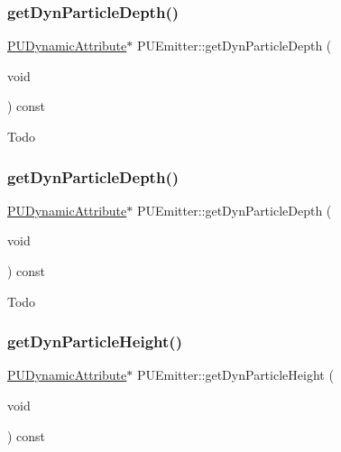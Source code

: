 \subsubsection{\texorpdfstring{get\+Dyn\+Particle\+Depth()}{getDynParticleDepth()}\hspace{0.1cm}{\footnotesize\ttfamily [1/2]}}
{\footnotesize\ttfamily \hyperlink{classPUDynamicAttribute}{P\+U\+Dynamic\+Attribute}$\ast$ P\+U\+Emitter\+::get\+Dyn\+Particle\+Depth (\begin{DoxyParamCaption}\item[{void}]{ }\end{DoxyParamCaption}) const\hspace{0.3cm}{\ttfamily [inline]}}

Todo \mbox{\label{classPUEmitter_a85a4428e2d1eb332d9f7eab2a411e56f}} 
\subsubsection{\texorpdfstring{get\+Dyn\+Particle\+Depth()}{getDynParticleDepth()}\hspace{0.1cm}{\footnotesize\ttfamily [2/2]}}
{\footnotesize\ttfamily \hyperlink{classPUDynamicAttribute}{P\+U\+Dynamic\+Attribute}$\ast$ P\+U\+Emitter\+::get\+Dyn\+Particle\+Depth (\begin{DoxyParamCaption}\item[{void}]{ }\end{DoxyParamCaption}) const\hspace{0.3cm}{\ttfamily [inline]}}

Todo \mbox{\label{classPUEmitter_a152502932d7c1642eb94f705092c2d60}} 
\subsubsection{\texorpdfstring{get\+Dyn\+Particle\+Height()}{getDynParticleHeight()}\hspace{0.1cm}{\footnotesize\ttfamily [1/2]}}
{\footnotesize\ttfamily \hyperlink{classPUDynamicAttribute}{P\+U\+Dynamic\+Attribute}$\ast$ P\+U\+Emitter\+::get\+Dyn\+Particle\+Height (\begin{DoxyParamCaption}\item[{void}]{ }\end{DoxyParamCaption}) const\hspace{0.3cm}{\ttfamily [inline]}}

